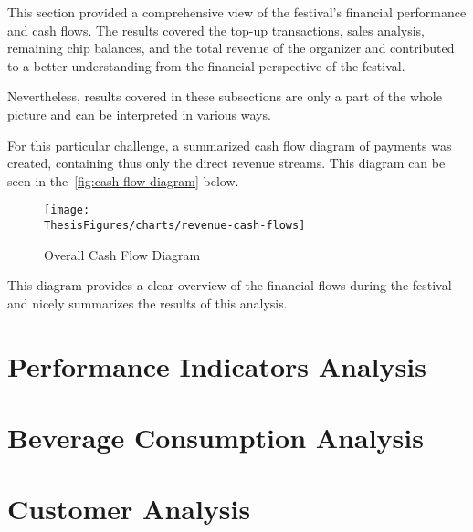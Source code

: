 This section provided a comprehensive view of the festival's financial performance and cash flows.
The results covered the top-up transactions, sales analysis, remaining chip balances, and the total revenue of the organizer and contributed to a better understanding from the financial perspective of the festival.

Nevertheless, results covered in these subsections are only a part of the whole picture and can be interpreted in various ways.

For this particular challenge, a summarized cash flow diagram of payments was created, containing thus only the direct revenue streams.
This diagram can be seen in the~\autoref{fig:cash-flow-diagram} below.

\begin{figure}[H]
	\centering
	\texttt{[image: \\ThesisFigures/charts/revenue-cash-flows]}
	\caption{Overall Cash Flow Diagram}
	\label{fig:cash-flow-diagram}
\end{figure}

This diagram provides a clear overview of the financial flows during the festival and nicely summarizes the results of this analysis.


\section{Performance Indicators Analysis}
\label{sec:analysis-performance-indicators}


\section{Beverage Consumption Analysis}
\label{sec:analysis-beverage-consumption}


\section{Customer Analysis}
\label{sec:analysis-customers}

